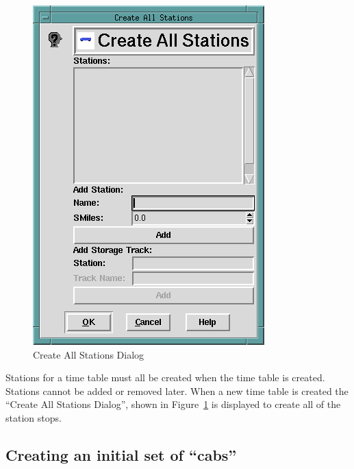 \begin{figure}[hbpt]
\begin{centering}
\includegraphics{TTCreateAllStations.png}
\caption{Create All Stations Dialog}
\label{fig:tt:CreateAllStationsDialog}
\end{centering}
\end{figure}
Stations for a time table must all be created when the time table is
created.  Stations cannot be added or removed later.  When a new time
table is created the ``Create All Stations Dialog'',  shown in
Figure~\ref{fig:tt:CreateAllStationsDialog} is displayed to create all
of the station stops.

\subsection{Creating an initial set of ``cabs''}

